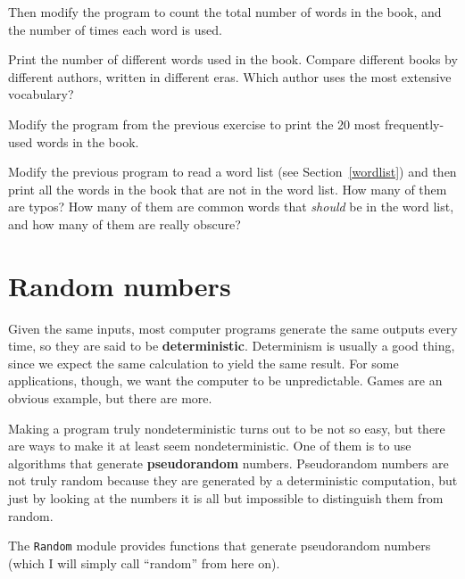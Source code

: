 \documentclass[10pt]{book}
\begin{document}
{\begin{ex}
Then modify the program to count the total number of words in
the book, and the number of times each word is used.


Print the number of different words used in the book.  Compare
different books by different authors, written in different eras.
Which author uses the most extensive vocabulary?
\end{ex}


\begin{ex}
Modify the program from the previous exercise to print the
20 most frequently-used words in the book.
\end{ex}


\begin{ex}
Modify the previous program to read a word list (see
Section~\ref{wordlist}) and then print all the words in the book that
are not in the word list.  How many of them are typos?  How many of
them are common words that {\em should} be in the word list, and how
many of them are really obscure?
\end{ex}


\section{Random numbers}


Given the same inputs, most computer programs generate the same
outputs every time, so they are said to be {\bf deterministic}.
Determinism is usually a good thing, since we expect the same
calculation to yield the same result.  For some applications, though,
we want the computer to be unpredictable.  Games are an obvious
example, but there are more.

Making a program truly nondeterministic turns out to be not so easy,
but there are ways to make it at least seem nondeterministic.  One of
them is to use algorithms that generate {\bf pseudorandom} numbers.
Pseudorandom numbers are not truly random because they are generated
by a deterministic computation, but just by looking at the numbers it
is all but impossible to distinguish them from random.


The {\tt Random} module provides functions that generate
pseudorandom numbers (which I will simply call ``random'' from
here on).

}
\end{document}
